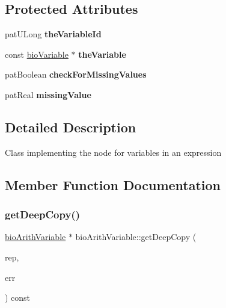 \subsection*{Protected Attributes}
\begin{DoxyCompactItemize}
\item 
\mbox{\label{classbio_arith_variable_a723d43aeb4f13c31be658e181770e93f}} 
pat\+U\+Long {\bfseries the\+Variable\+Id}
\item 
\mbox{\label{classbio_arith_variable_a12802d4fe378cf5cbac37d0723ee23a8}} 
const \hyperlink{classbio_variable}{bio\+Variable} $\ast$ {\bfseries the\+Variable}
\item 
\mbox{\label{classbio_arith_variable_a1653f23f7a3d6b1ad30117e536aad255}} 
pat\+Boolean {\bfseries check\+For\+Missing\+Values}
\item 
\mbox{\label{classbio_arith_variable_a1b5e076f79e9ef016ba640b1399c5577}} 
pat\+Real {\bfseries missing\+Value}
\end{DoxyCompactItemize}


\subsection{Detailed Description}
Class implementing the node for variables in an expression 

\subsection{Member Function Documentation}
\mbox{\label{classbio_arith_variable_a13698945a07c98905254d7e773555de3}} 
\subsubsection{\texorpdfstring{get\+Deep\+Copy()}{getDeepCopy()}}
{\footnotesize\ttfamily \hyperlink{classbio_arith_variable}{bio\+Arith\+Variable} $\ast$ bio\+Arith\+Variable\+::get\+Deep\+Copy (\begin{DoxyParamCaption}\item[{\hyperlink{classbio_expression_repository}{bio\+Expression\+Repository} $\ast$}]{rep,  }\item[{pat\+Error $\ast$\&}]{err }\end{DoxyParamCaption}) const\hspace{0.3cm}{\ttfamily [virtual]}}

